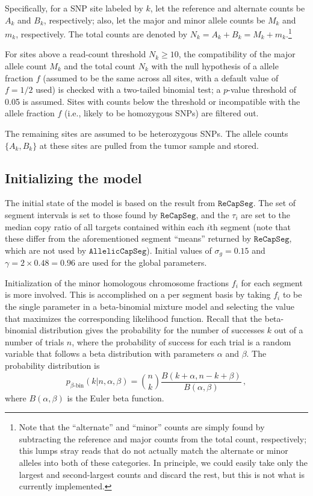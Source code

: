 \documentclass[nofootinbib,amssymb,amsmath]{revtex4}
\newcommand{\RCS}{\texttt{ReCapSeg}}
\newcommand{\ACS}{\texttt{AllelicCapSeg}}
\begin{document}
Specifically, for a SNP site labeled by $k$, let the reference and alternate counts be $A_k$ and $B_k$, respectively; also, let the major and minor allele counts be $M_k$ and $m_k$, respectively.  The total counts are denoted by $N_k = A_k + B_k = M_k + m_k$.\footnote{Note that the ``alternate'' and  ``minor'' counts are simply found by subtracting the reference and major counts from the total count, respectively; this lumps stray reads that do not actually match the alternate or minor alleles into both of these categories.  In principle, we could easily take only the largest and second-largest counts and discard the rest, but this is not what is currently implemented.}

For sites above a read-count threshold $N_k \geq 10$, the compatibility of the major allele count $M_k$ and the total count $N_k$ with the null hypothesis of a allele fraction $f$ (assumed to be the same across all sites, with a default value of $f = 1/2$ used) is checked with a two-tailed binomial test; a $p$-value threshold of 0.05 is assumed.  Sites with counts below the threshold or incompatible with the allele fraction $f$ (i.e., likely to be homozygous SNPs) are filtered out.

The remaining sites are assumed to be heterozygous SNPs.  The allele counts $\{A_k, B_k\}$ at these sites are pulled from the tumor sample and stored.

\subsection{Initializing the model} \label{initializing-the-model}

The initial state of the model is based on the result from $\RCS$.  The set of segment intervals is set to those found by $\RCS$, and the $\tau_i$ are set to the median copy ratio of all targets contained within each $i$th segment (note that these differ from the aforementioned segment ``means'' returned by $\RCS$, which are not used by $\ACS$).  Initial values of $\sigma_g = 0.15$ and $\gamma = 2 \times 0.48 = 0.96$ are used for the global parameters.

Initialization of the minor homologous chromosome fractions $f_i$ for each segment is more involved.  This is accomplished on a per segment basis by taking $f_i$ to be the single parameter in a beta-binomial mixture model and selecting the value that maximizes the corresponding likelihood function.  Recall that the beta-binomial distribution gives the probability for the number of successes $k$ out of a number of trials $n$, where the probability of success for each trial is a random variable that follows a beta distribution with parameters $\alpha$ and $\beta$.  The probability distribution is
\begin{equation}
p_{\beta\text{-bin}}(k | n, \alpha, \beta) = {n \choose k} \frac{B(k+\alpha, n-k+\beta)}{B(\alpha, \beta)}\,,
\end{equation}
where $B(\alpha, \beta)$ is the Euler beta function.
\end{document}
